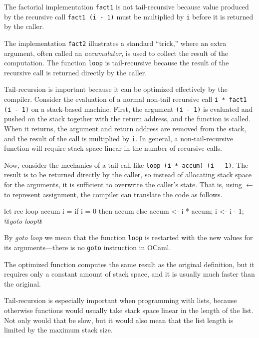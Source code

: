 The factorial implementation \hbox{\lstinline/fact1/} is not tail-recursive
because value produced by the recursive call \hbox{\lstinline/fact1 (i - 1)/}
must be multiplied by \hbox{\lstinline/i/} before it is returned by the
caller.

The implementation \hbox{\lstinline/fact2/} illustrates a standard ``trick,''
where an extra argument, often called an \emph{accumulator}, is used
to collect the result of the computation.  The
function \hbox{\lstinline/loop/} is tail-recursive because the result of the
recursive call is returned directly by the caller.


Tail-recursion is important because it can be optimized effectively by
the compiler.  Consider the evaluation of a normal non-tail recursive
call \hbox{\lstinline/i * fact1 (i - 1)/} on a stack-based machine.  First,
the argument \hbox{\lstinline/(i - 1)/} is evaluated and pushed on the stack
together with the return address, and the function is called.  When it
returns, the argument and return address are removed from the stack,
and the result of the call is multiplied by \hbox{\lstinline/i/}.  In
general, a non-tail-recursive function will require stack space linear
in the number of recursive calls.

Now, consider the mechanics of a tail-call like
%
\hbox{\lstinline/loop (i * accum) (i - 1)/}.
The result is to be returned directly by the caller, so instead of
allocating stack space for the arguments, it is sufficient to
overwrite the caller's state.  That is, using $\leftarrow$ to
represent assignment, the compiler can translate the code as follows.

\begin{ocaml}
let rec loop accum i =
   if i = 0 then
      accum
   else
      accum <- i * accum;
      i <- i - 1;
      @\textit{goto loop}@
\end{ocaml}
%
By \textit{goto loop} we mean that the function
\hbox{\lstinline/loop/} is restarted with the new values for its
arguments---there is no \lstinline/goto/ instruction in OCaml.

The optimized function computes the same result as the original
definition, but it requires only a constant amount of stack space, and
it is usually much faster than the original.


Tail-recursion is especially important when programming with lists,
because otherwise functions would usually take stack space linear in
the length of the list.  Not only would that be slow, but it would
also mean that the list length is limited by the maximum stack size.


